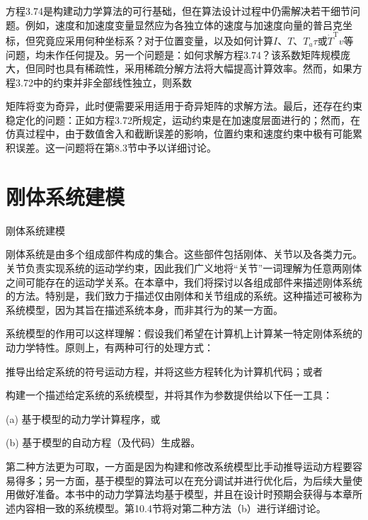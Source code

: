 \documentclass[10pt,a4paper]{book}
\theoremstyle{thmstyle} %
\theoremstyle{defstyle} %
\theoremstyle{prostyle} %
\begin{document}
方程3.74是构建动力学算法的可行基础，但在算法设计过程中仍需解决若干细节问题。例如，速度和加速度变量显然应为各独立体的速度与加速度向量的普吕克坐标，但究竟应采用何种坐标系？对于位置变量，以及如何计算$I$、$T$、$T_a\tau$或$\dot{T}^{\mathrm{T}}v$等问题，均未作任何提及。另一个问题是：如何求解方程3.74？该系数矩阵规模庞大，但同时也具有稀疏性，采用稀疏分解方法将大幅提高计算效率。然而，如果方程3.72中的约束并非全部线性独立，则系数



矩阵将变为奇异，此时便需要采用适用于奇异矩阵的求解方法。最后，还存在约束稳定化的问题：正如方程3.72所规定，运动约束是在加速度层面进行的；然而，在仿真过程中，由于数值舍入和截断误差的影响，位置约束和速度约束中极有可能累积误差。这一问题将在第8.3节中予以详细讨论。



\chapter{刚体系统建模}





刚体系统建模



刚体系统是由多个组成部件构成的集合。这些部件包括刚体、关节以及各类力元。关节负责实现系统的运动学约束，因此我们广义地将“关节”一词理解为任意两刚体之间可能存在的运动学关系。在本章中，我们将探讨以各组成部件来描述刚体系统的方法。特别是，我们致力于描述仅由刚体和关节组成的系统。这种描述可被称为系统模型，因为其旨在描述系统本身，而非其行为的某一方面。



系统模型的作用可以这样理解：假设我们希望在计算机上计算某一特定刚体系统的动力学特性。原则上，有两种可行的处理方式：



推导出给定系统的符号运动方程，并将这些方程转化为计算机代码；或者



构建一个描述给定系统的系统模型，并将其作为参数提供给以下任一工具：



(a) 基于模型的动力学计算程序，或



(b) 基于模型的自动方程（及代码）生成器。



第二种方法更为可取，一方面是因为构建和修改系统模型比手动推导运动方程要容易得多；另一方面，基于模型的算法可以在充分调试并进行优化后，为后续大量使用做好准备。本书中的动力学算法均基于模型，并且在设计时预期会获得与本章所述内容相一致的系统模型。第10.4节将对第二种方法（b）进行详细讨论。
\end{document}

